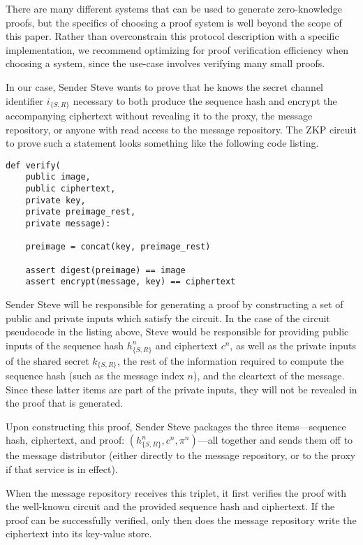 There are many different systems that can be used to generate zero-knowledge proofs, but the specifics of choosing a proof system is well beyond the scope of this paper. Rather than overconstrain this protocol description with a specific implementation, we recommend optimizing for proof verification efficiency when choosing a system, since the use-case involves verifying many small proofs.

In our case, Sender Steve wants to prove that he knows the secret channel identifier $i_{\{S,R\}}$ necessary to both produce the sequence hash and encrypt the accompanying ciphertext without revealing it to the proxy, the message repository, or anyone with read access to the message repository. The ZKP circuit to prove such a statement looks something like the following code listing.

\begin{verbatim}
def verify(
    public image,
    public ciphertext,
    private key,
    private preimage_rest,
    private message):

    preimage = concat(key, preimage_rest)

    assert digest(preimage) == image
    assert encrypt(message, key) == ciphertext
\end{verbatim}

Sender Steve will be responsible for generating a proof by constructing a set of public and private inputs which satisfy the circuit. In the case of the circuit pseudocode in the listing above, Steve would be responsible for providing public inputs of the sequence hash $h_{\{S,R\}}^n$ and ciphertext $c^n$, as well as the private inputs of the shared secret $k_{\{S,R\}}$, the rest of the information required to compute the sequence hash (such as the message index $n$), and the cleartext of the message. Since these latter items are part of the private inputs, they will not be revealed in the proof that is generated.

Upon constructing this proof, Sender Steve packages the three items---sequence hash, ciphertext, and proof: $(h_{\{S,R\}}^n, c^n, \pi^n)$---all together and sends them off to the message distributor (either directly to the message repository, or to the proxy if that service is in effect).

When the message repository receives this triplet, it first verifies the proof with the well-known circuit and the provided sequence hash and ciphertext. If the proof can be successfully verified, only then does the message repository write the ciphertext into its key-value store.

